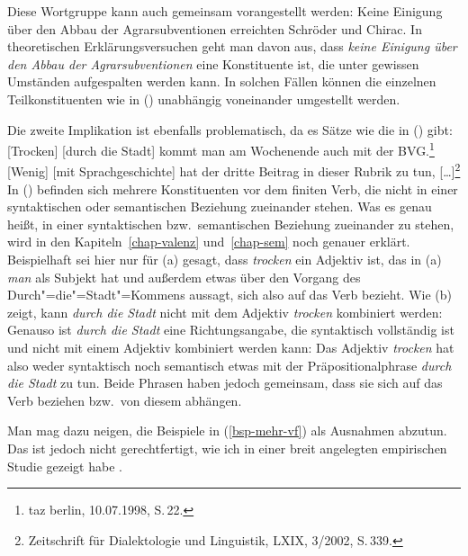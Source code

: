 Diese Wortgruppe kann auch gemeinsam vorangestellt werden:
\ea
Keine Einigung über den Abbau der Agrarsubventionen erreichten Schröder und Chirac.
\z
In theoretischen Erklärungsversuchen geht man davon aus, dass \emph{keine Einigung über den Abbau der Agrarsubventionen}
eine Konstituente ist, die unter gewissen Umständen aufgespalten werden kann. In solchen Fällen können die einzelnen
Teilkonstituenten wie in () unabhängig voneinander umgestellt werden.



Die zweite Implikation ist ebenfalls problematisch, da es Sätze
wie die in () gibt:
\eal
\label{bsp-mehr-vf}
\ex\label{bsp-trocken-durch-die-stadt}
{}[Trocken] [durch die Stadt] kommt man am Wochenende auch mit der BVG.\footnote{
        taz berlin, 10.07.1998, S.\,22.
      }
\ex {}[Wenig] [mit Sprachgeschichte] hat der dritte Beitrag in dieser Rubrik zu tun, [\ldots]\footnote{
  Zeitschrift für Dialektologie und Linguistik, LXIX, 3/2002, S.\,339.
}
\zl
In () befinden sich mehrere Konstituenten vor dem finiten Verb, die nicht in einer syntaktischen
oder semantischen
Beziehung zueinander stehen. Was es genau heißt,
in einer syntaktischen bzw.\ semantischen Beziehung zueinander zu stehen, wird in den
Kapiteln~\ref{chap-valenz} und~\ref{chap-sem} noch genauer erklärt. Beispielhaft sei hier nur
für (a) gesagt, dass \emph{trocken} ein Adjektiv ist, das in (a) \emph{man}
als Subjekt hat und außerdem etwas über den Vorgang des Durch"=die"=Stadt"=Kommens aussagt,
sich also auf das Verb bezieht. Wie (b) zeigt, kann \emph{durch die Stadt} nicht
mit dem Adjektiv \emph{trocken} kombiniert werden:
\eal
{}
\zl
Genauso ist \emph{durch die Stadt} eine Richtungsangabe, die syntaktisch vollständig ist
und nicht mit einem Adjektiv kombiniert werden kann:
\eal
{}
\zl
Das Adjektiv \emph{trocken} hat also weder syntaktisch noch semantisch etwas mit 
der Präpositionalphrase \emph{durch die Stadt} zu tun. Beide Phrasen haben jedoch gemeinsam,
dass sie sich auf das Verb beziehen bzw.\ von diesem abhängen.

Man mag dazu neigen, die Beispiele in (\ref{bsp-mehr-vf}) als Ausnahmen
abzutun. Das ist jedoch nicht gerechtfertigt, wie ich in einer breit angelegten empirischen
Studie gezeigt habe \citep{Mueller2003b}.

